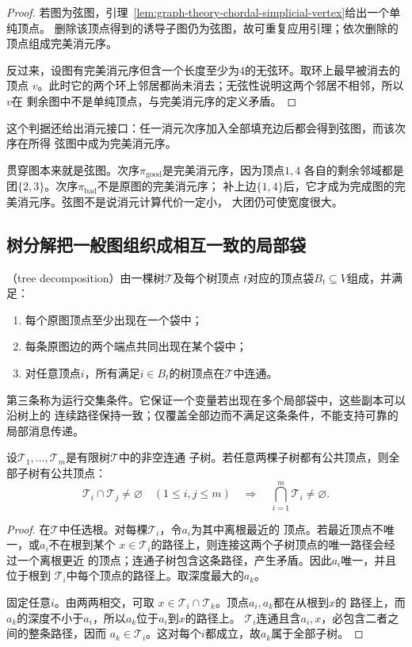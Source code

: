 \begin{proof}
若图为弦图，引理~\ref{lem:graph-theory-chordal-simplicial-vertex}给出一个单纯顶点。
删除该顶点得到的诱导子图仍为弦图，故可重复应用引理；依次删除的顶点组成完美消元序。

反过来，设图有完美消元序但含一个长度至少为\(4\)的无弦环。取环上最早被消去的顶点
\(v\)。此时它的两个环上邻居都尚未消去；无弦性说明这两个邻居不相邻，所以\(v\)在
剩余图中不是单纯顶点，与完美消元序的定义矛盾。
\end{proof}

这个判据还给出消元接口：任一消元次序加入全部填充边后都会得到弦图，而该次序在所得
弦图中成为完美消元序。

贯穿图本来就是弦图。次序\(\pi_{\mathrm{good}}\)是完美消元序，因为顶点\(1,4\)
各自的剩余邻域都是团\(\{2,3\}\)。次序\(\pi_{\mathrm{bad}}\)不是原图的完美消元序；
补上边\(\{1,4\}\)后，它才成为完成图的完美消元序。弦图不是说消元计算代价一定小，
大团仍可使宽度很大。

\subsection{树分解把一般图组织成相互一致的局部袋}

（tree decomposition）由一棵树\(\mathcal{T}\)及每个树顶点
\(t\)对应的顶点袋\(B_t\subseteq V\)组成，并满足：
\begin{enumerate}
  \item 每个原图顶点至少出现在一个袋中；
  \item 每条原图边的两个端点共同出现在某个袋中；
  \item 对任意顶点\(i\)，所有满足\(i\in B_t\)的树顶点在\(\mathcal{T}\)中连通。
\end{enumerate}
第三条称为运行交集条件。它保证一个变量若出现在多个局部袋中，这些副本可以沿树上的
连续路径保持一致；仅覆盖全部边而不满足这条条件，不能支持可靠的局部消息传递。

\begin{lemma}
  \label{lem:graph-theory-subtree-helly}
  设\(\mathcal{T}_1,\ldots,\mathcal{T}_m\)是有限树\(\mathcal{T}\)中的非空连通
  子树。若任意两棵子树都有公共顶点，则全部子树有公共顶点：
  \[
    \mathcal{T}_i\cap\mathcal{T}_j\neq\varnothing
    \quad(1\leq i,j\leq m)
    \quad\Longrightarrow\quad
    \bigcap_{i=1}^{m}\mathcal{T}_i\neq\varnothing.
  \]
\end{lemma}

\begin{proof}
在\(\mathcal{T}\)中任选根。对每棵\(\mathcal{T}_i\)，令\(a_i\)为其中离根最近的
顶点。若最近顶点不唯一，或\(a_i\)不在根到某个
\(x\in\mathcal{T}_i\)的路径上，则连接这两个子树顶点的唯一路径会经过一个离根更近
的顶点；连通子树包含这条路径，产生矛盾。因此\(a_i\)唯一，并且位于根到
\(\mathcal{T}_i\)中每个顶点的路径上。取深度最大的\(a_k\)。

固定任意\(i\)。由两两相交，可取
\(x\in\mathcal{T}_i\cap\mathcal{T}_k\)。顶点\(a_i,a_k\)都在从根到\(x\)的
路径上，而\(a_k\)的深度不小于\(a_i\)，所以\(a_k\)位于\(a_i\)到\(x\)的路径上。
\(\mathcal{T}_i\)连通且含\(a_i,x\)，必包含二者之间的整条路径，因而
\(a_k\in\mathcal{T}_i\)。这对每个\(i\)都成立，故\(a_k\)属于全部子树。
\end{proof}

